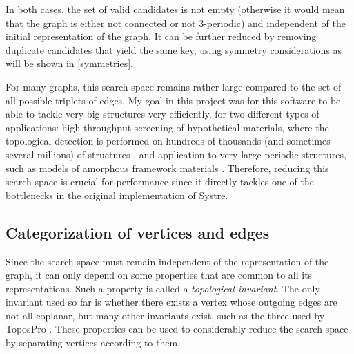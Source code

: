 \documentclass[main.tex]{subfiles}
\begin{document}
In both cases, the set of valid candidates is not empty (otherwise it would mean that the graph is either not connected or not 3-periodic) and independent of the initial representation of the graph. It can be further reduced by removing duplicate candidates that yield the same key, using symmetry considerations as will be shown in \cref{symmetries}.


For many graphs, this search space remains rather large compared to the set of all possible triplets of edges.  %
My goal in this project was for this software to be able to tackle very big structures very efficiently, for two different types of applications: high-throughput screening of hypothetical materials, where the topological detection is performed on hundreds of thousands (and sometimes several millions) of structures \autocite{ren2022highthroughput}, and application to very large periodic structures, such as models of amorphous framework materials \autocite{castel2022atomistic}. Therefore, reducing this search space is crucial for performance since it directly tackles one of the bottlenecks in the original implementation of Systre.

\subsection{Categorization of vertices and edges}

Since the search space must remain independent of the representation of the graph, it can only depend on some properties that are common to all its representations. Such a property is called a \emph{topological invariant}. The only invariant used so far is whether there exists a vertex whose outgoing edges are not all coplanar, but many other invariants exist, such as the three used by ToposPro \autocite{ToposPro}. These properties can be used to considerably reduce the search space by separating vertices according to them.
\end{document}
